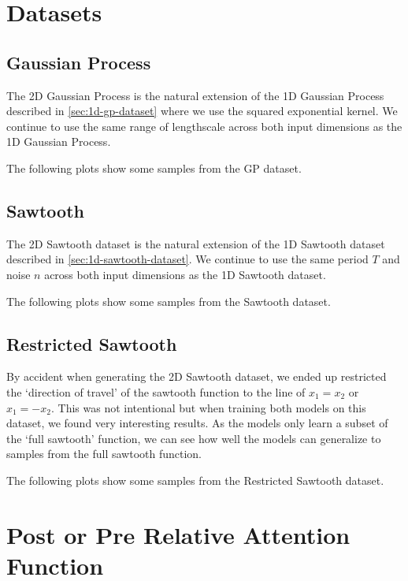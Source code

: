 \documentclass[../../main.tex]{subfiles}
\begin{document}
\section{Datasets}

\subsection{Gaussian Process}

The 2D Gaussian Process is the natural extension of the 1D Gaussian Process described in \autoref{sec:1d-gp-dataset} where we use the squared exponential kernel. We continue to use the same range of lengthscale across both input dimensions as the 1D Gaussian Process. 

The following plots show some samples from the GP dataset.



\subsection{Sawtooth}

The 2D Sawtooth dataset is the natural extension of the 1D Sawtooth dataset described in \autoref{sec:1d-sawtooth-dataset}. We continue to use the same period $T$ and noise $n$ across both input dimensions as the 1D Sawtooth dataset.

The following plots show some samples from the Sawtooth dataset.


\subsection{Restricted Sawtooth}

By accident when generating the 2D Sawtooth dataset, we ended up restricted the `direction of travel' of the sawtooth function to the line of $x_1 = x_2$ or $x_1 = -x_2$. This was not intentional but when training both models on this dataset, we found very interesting results. As the models only learn a subset of the `full sawtooth' function, we can see how well the models can generalize to samples from the full sawtooth function.

The following plots show some samples from the Restricted Sawtooth dataset.

\section{Post or Pre Relative Attention Function}
\end{document}
